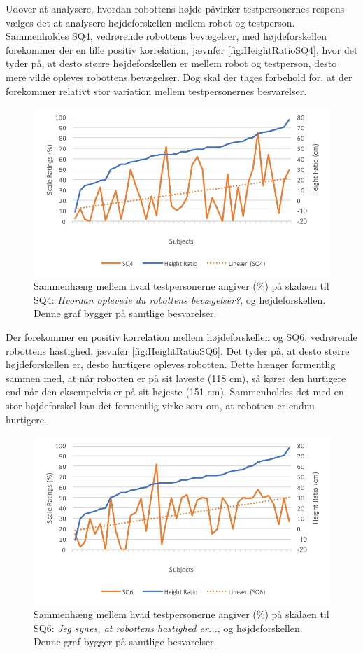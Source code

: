 \noindent
%
Udover at analysere, hvordan robottens højde påvirker testpersonernes respons vælges det at analysere højdeforskellen mellem robot og testperson. Sammenholdes SQ4, vedrørende robottens bevægelser, med højdeforskellen forekommer der en lille positiv korrelation, jævnfør \autoref{fig:HeightRatioSQ4}, hvor det tyder på, at desto større højdeforskellen er mellem robot og testperson, desto mere vilde opleves robottens bevægelser. Dog skal der tages forbehold for, at der forekommer relativt stor variation mellem testpersonernes besvarelser. 
%
\begin{figure}[H]
\centering
\includegraphics[width=\textwidth]{Figure/DatabehandlingSkalaer/Demografi/HeightRatioSQ4}
\caption{Sammenhæng mellem hvad testpersonerne angiver (\%) på skalaen til SQ4: \textit{Hvordan oplevede du robottens bevægelser?}, og højdeforskellen. Denne graf bygger på samtlige besvarelser.}
\label{fig:HeightRatioSQ4}
\end{figure}
\noindent
%
Der forekommer en positiv korrelation mellem højdeforskellen og SQ6, vedrørende robottens hastighed, jævnfør \autoref{fig:HeightRatioSQ6}. Det tyder på, at desto større højdeforskellen er, desto hurtigere opleves robotten. Dette hænger formentlig sammen med, at når robotten er på sit laveste (118 cm), så kører den hurtigere end når den eksempelvis er på sit højeste (151 cm). Sammenholdes det med en stor højdeforskel kan det formentlig virke som om, at robotten er endnu hurtigere. 
%
\begin{figure}[H]
\centering
\includegraphics[width=\textwidth]{Figure/DatabehandlingSkalaer/Demografi/HeightRatioSQ6}
\caption{Sammenhæng mellem hvad testpersonerne angiver (\%) på skalaen til SQ6: \textit{Jeg synes, at robottens hastighed er...}, og højdeforskellen. Denne graf bygger på samtlige besvarelser.}
\label{fig:HeightRatioSQ6}
\end{figure}
